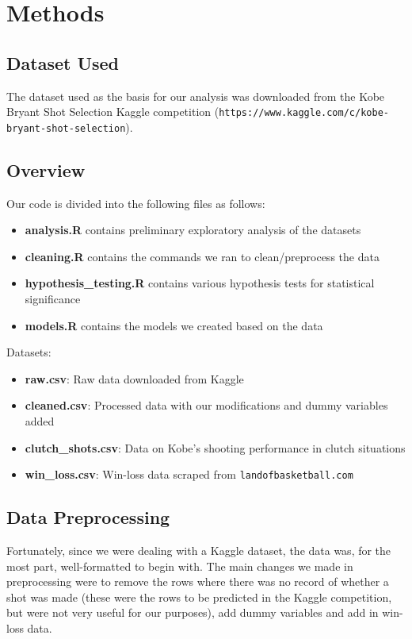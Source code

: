 \documentclass[paper=a4, fontsize=11pt]{scrartcl} %
\numberwithin{equation}{section} %
\numberwithin{figure}{section} %
\numberwithin{table}{section} %
\begin{document}
\section{Methods}
	\subsection{Dataset Used}
	\hspace*{1cm}The dataset used as the basis for our analysis was downloaded from the Kobe Bryant Shot Selection Kaggle competition (\texttt{https://www.kaggle.com/c/kobe-bryant-shot-selection}).
	\subsection{Overview}
	Our code is divided into the following files as follows:
		\begin{itemize}
			\item \textbf{analysis.R} contains preliminary exploratory analysis of the datasets
			\item \textbf{cleaning.R} contains the commands we ran to clean/preprocess the data
			\item \textbf{hypothesis\_testing.R} contains various hypothesis tests for statistical significance
			\item \textbf{models.R} contains the models we created based on the data
		\end{itemize}
	Datasets:
		\begin{itemize}
			\item \textbf{raw.csv}: Raw data downloaded from Kaggle
			\item \textbf{cleaned.csv}: Processed data with our modifications and dummy variables added
			\item \textbf{clutch\_shots.csv}: Data on Kobe's shooting performance in clutch situations
			\item \textbf{win\_loss.csv}: Win-loss data scraped from \texttt{landofbasketball.com}
		\end{itemize}
	\subsection{Data Preprocessing}
	\hspace*{1cm}Fortunately, since we were dealing with a Kaggle dataset, the data was, for the most part, well-formatted to begin with. The main changes we made in preprocessing were to remove the rows where there was no record of whether a shot was made (these were the rows to be predicted in the Kaggle competition, but were not very useful for our purposes), add dummy variables and add in win-loss data.
\end{document}
